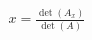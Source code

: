 \documentclass[preview]{standalone}
\begin{document}
\begin{align*}
x = \frac{\det(A_x)}{\det(A)}
\end{align*}
\end{document}
